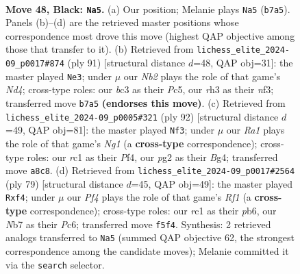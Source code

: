 \documentclass[11pt]{article}
\begin{document}
\clearpage

\begin{figure}[p]\centering
\begin{subfigure}{0.46\textwidth}\centering
\resizebox{\linewidth}{!}{%
\newchessgame
\chessboard[
  setfen={r7/pn6/1pr1p1kp/5p2/2P5/N1B1PP1R/P3K1P1/2R5 b - - 4 48},
  showmover=false,
  pgfstyle=straightmove, color=movearrow, markmove={b7-a5}
]}
\caption{}
\end{subfigure}\hfill
\begin{subfigure}{0.46\textwidth}\centering
\resizebox{\linewidth}{!}{%
\newchessgame
\chessboard[
  setfen={8/6k1/1p2r2p/p1pnP3/3p2P1/1P3N1P/1PP1R2K/8 b - - 4 46},
  showmover=false,
  pgfstyle=straightmove, color=movearrow, markmove={d5-e3}
]}
\caption{}
\end{subfigure}
\\[4pt]
\begin{subfigure}{0.46\textwidth}\centering
\resizebox{\linewidth}{!}{%
\newchessgame
\chessboard[
  setfen={8/r4pb1/2p3k1/n2p4/pr1P1PB1/6P1/RPR2PK1/6N1 w - - 20 47},
  showmover=false,
  pgfstyle=straightmove, color=movearrow, markmove={g1-f3}
]}
\caption{}
\end{subfigure}\hfill
\begin{subfigure}{0.46\textwidth}\centering
\resizebox{\linewidth}{!}{%
\newchessgame
\chessboard[
  setfen={5r2/1p1r2pk/1Pp1p2p/8/3P1PNP/3R1P2/1R6/7K b - - 2 40},
  showmover=false,
  pgfstyle=straightmove, color=movearrow, markmove={f8-f4}
]}
\caption{}
\end{subfigure}
\caption{\textbf{Move 48, Black: \texttt{Na5}.} (a) Our position; Melanie plays \texttt{Na5} (\texttt{b7a5}). Panels (b)--(d) are the retrieved master positions whose correspondence most drove this move (highest QAP objective among those that transfer to it). (b) Retrieved from \texttt{lichess\_elite\_2024-09\_p0017\#874} (ply 91) [structural distance $d$=48, QAP obj=31]: the master played \texttt{Ne3}; under $\mu$ our \emph{Nb2} plays the role of that game's \emph{Nd4}; cross-type roles: our \emph{b}c3 as their \emph{P}c5, our \emph{r}h3 as their \emph{n}f3; transferred move \texttt{b7a5} \textbf{(endorses this move)}. (c) Retrieved from \texttt{lichess\_elite\_2024-09\_p0005\#321} (ply 92) [structural distance $d$=49, QAP obj=81]: the master played \texttt{Nf3}; under $\mu$ our \emph{Ra1} plays the role of that game's \emph{Ng1} (a \textbf{cross-type} correspondence); cross-type roles: our \emph{r}c1 as their \emph{P}f4, our \emph{p}g2 as their \emph{B}g4; transferred move \texttt{a8c8}. (d) Retrieved from \texttt{lichess\_elite\_2024-09\_p0017\#2564} (ply 79) [structural distance $d$=45, QAP obj=49]: the master played \texttt{Rxf4}; under $\mu$ our \emph{Pf4} plays the role of that game's \emph{Rf1} (a \textbf{cross-type} correspondence); cross-type roles: our \emph{r}c1 as their \emph{p}b6, our \emph{N}b7 as their \emph{P}c6; transferred move \texttt{f5f4}. Synthesis: 2 retrieved analogs transferred to \texttt{Na5} (summed QAP objective 62, the strongest correspondence among the candidate moves); Melanie committed it via the \texttt{search} selector.}
\label{fig:thought-m95}
\end{figure}
\end{document}

